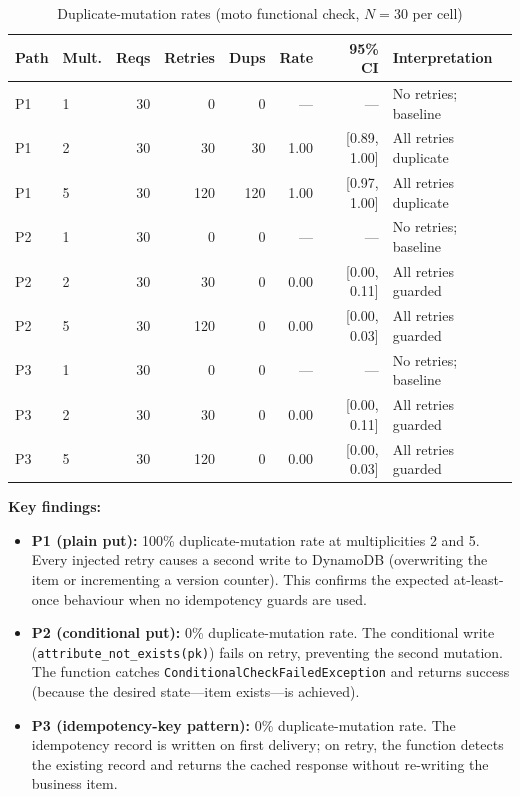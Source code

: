 \begin{table}[h]
\centering
\caption{Duplicate-mutation rates (moto functional check, $N = 30$ per cell)}
\label{tab:eval_dup_rates}
\begin{tabular}{llrrrrrl}
\hline
\textbf{Path} & \textbf{Mult.} & \textbf{Reqs} & \textbf{Retries} & \textbf{Dups} & \textbf{Rate} & \textbf{95\% CI} & \textbf{Interpretation} \\
\hline
P1 & 1 & 30 & 0 & 0 & --- & --- & No retries; baseline \\
P1 & 2 & 30 & 30 & 30 & 1.00 & [0.89, 1.00] & All retries duplicate \\
P1 & 5 & 30 & 120 & 120 & 1.00 & [0.97, 1.00] & All retries duplicate \\
\hline
P2 & 1 & 30 & 0 & 0 & --- & --- & No retries; baseline \\
P2 & 2 & 30 & 30 & 0 & 0.00 & [0.00, 0.11] & All retries guarded \\
P2 & 5 & 30 & 120 & 0 & 0.00 & [0.00, 0.03] & All retries guarded \\
\hline
P3 & 1 & 30 & 0 & 0 & --- & --- & No retries; baseline \\
P3 & 2 & 30 & 30 & 0 & 0.00 & [0.00, 0.11] & All retries guarded \\
P3 & 5 & 30 & 120 & 0 & 0.00 & [0.00, 0.03] & All retries guarded \\
\hline
\end{tabular}
\end{table}

\textbf{Key findings:}

\begin{itemize}
    \item \textbf{P1 (plain put):} 100\% duplicate-mutation rate at multiplicities 2 and 5. Every injected retry causes a second write to DynamoDB (overwriting the item or incrementing a version counter). This confirms the expected at-least-once behaviour when no idempotency guards are used.
    \item \textbf{P2 (conditional put):} 0\% duplicate-mutation rate. The conditional write (\texttt{attribute\_not\_exists(pk)}) fails on retry, preventing the second mutation. The function catches \texttt{ConditionalCheckFailedException} and returns success (because the desired state---item exists---is achieved).
    \item \textbf{P3 (idempotency-key pattern):} 0\% duplicate-mutation rate. The idempotency record is written on first delivery; on retry, the function detects the existing record and returns the cached response without re-writing the business item.
\end{itemize}


